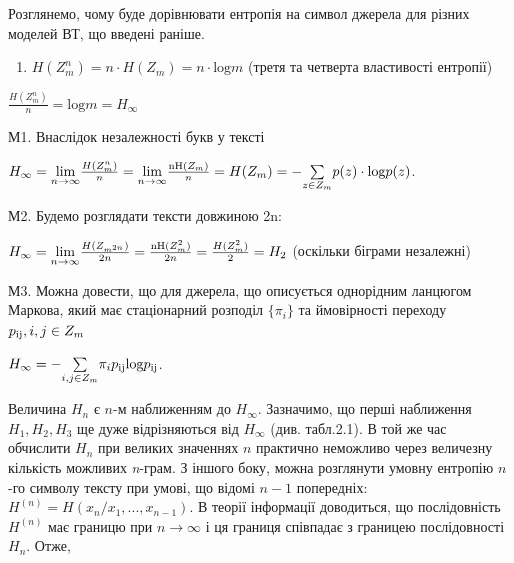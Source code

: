 \documentclass[a4paper]{article}
\newcommand\liststyleWWviiiNumxvi{%
\renewcommand\theenumi{\arabic{enumi}}
\renewcommand\theenumii{\arabic{enumii}}
\renewcommand\theenumiii{\arabic{enumiii}}
\renewcommand\theenumiv{\arabic{enumiv}}
\renewcommand\labelenumi{М\theenumi.}
\renewcommand\labelenumii{\theenumii.}
\renewcommand\labelenumiii{\theenumiii.}
\renewcommand\labelenumiv{\theenumiv.}
}
\newcounter{}
\newcommand\normalsubformula[1]{\text{\mathversion{normal}$#1$}}
\begin{document}
\bigskip

Розглянемо, чому буде дорівнювати ентропія на символ джерела для різних моделей
ВТ, що введені раніше.

\liststyleWWviiiNumxvi
\begin{enumerate}
\item  ${H(Z_{{m}}^{{n}})=n\cdot H(Z_{{m}})=n\cdot \text{log}m}$ (третя та
четверта властивості ентропії)
\end{enumerate}
{\centering  ${\frac{H(Z_{{m}}^{{n}})}{n}=\text{log}m=H_{{\infty }}}$\par}

М1. Внаслідок незалежності букв у тексті

{\centering
 ${H_{{\infty }}=\underset{{n\rightarrow \infty
}}{{\text{lim}}}\frac{H(Z_{{m}}^{{n}})}{n}=\underset{{n\rightarrow \infty
}}{{\text{lim}}}\frac{\normalsubformula{\text{nH}}(Z_{{m}})}{n}=H(Z_{{m}})=-\underset{{z\in
Z_{{m}}}}{\sum }{p(z)\cdot \text{log}p(z)}}$.
\par}

М2. Будемо розглядати тексти довжиною 2n:

 ${H_{{\infty }}=\underset{{n\rightarrow \infty
}}{{\text{lim}}}\frac{H(Z_{{m}^{{2n}}})}{2n}=\frac{\normalsubformula{\text{nH}}(Z_{{m}}^{{2}})}{2n}=\frac{H(Z_{{m}}^{{2}})}{2}=H_{{2}}}$
(оскільки біграми незалежні)

М3. Можна довести, що для джерела, що описується однорідним ланцюгом Маркова,
який має стаціонарний розподіл  ${\{\pi _{{i}}\}}$ та ймовірності переходу 
${p_{{\normalsubformula{\text{ij}}}},i,j\in Z_{{m}}}$

{\centering
 ${H_{{\infty }}=-\underset{{i,j\in Z_{{m}}}}{\sum }{\pi
_{{i}}p_{{\normalsubformula{\text{ij}}}}\text{log}p_{{\normalsubformula{\text{ij}}}}}}$.
\par}

Величина  ${H_{{n}}}$ є  ${n}${}-м наближенням до  ${H_{{\infty }}}$. Зазначимо,
що перші наближення  ${H_{{1}},H_{{2}},H_{{3}}}$ ще дуже відрізняються від 
${H_{{\infty }}}$ (див. табл.2.1). В той же час обчислити  ${H_{{n}}}$ при
великих значеннях  ${n}$ практично неможливо  через величезну кількість
можливих \textit{n}{}-грам. З іншого боку, можна розглянути умовну ентропію 
${n}${}-го символу тексту при умові, що відомі  ${n-1}$ попередніх: 
${H^{{(n)}}=H(x_{{n}}/x_{{1}},\text{.}\text{.}\text{.},x_{{n-1}})}$. В теорії
інформації доводиться, що послідовність  ${H^{{(n)}}}$ має границю при 
${n\rightarrow \infty }$ і ця границя співпадає з границею послідовності 
${H_{{n}}}$. Отже,
\end{document}
